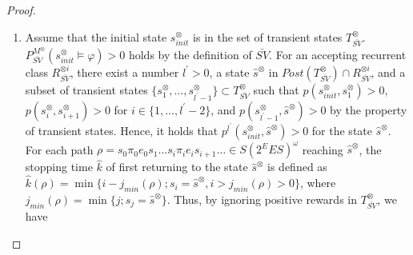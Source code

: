 \documentclass[10pt]{article}
\theoremstyle{definition}
\begin{document}
\begin{proof}
\begin{enumerate}
  \begin{align}
    V^{\bar{SV}}(s^{\otimes}_{init}) - V^{SV^{\ast}}(s^{\otimes}_{init})
     > & \frac{ \gamma^{\hat{K} - 1}}{ 1 - \gamma^{\hat{K} - 1}} r_p - ( m + \frac{1}{1-\gamma} ||\mathcal{R}_1||_{\infty} ) \nonumber \\
     = & ( \frac{ \gamma^{\hat{K} - 1}}{ 1 - \gamma^{\hat{K} - 1}} r_p - \frac{1}{1-\gamma} ||\mathcal{R}_1||_{\infty} ) - m, \nonumber
  \intertext{by the settings of $\gamma^{\ast}$ and $r^{\ast}_p$, we have}
    V^{\bar{SV}}(s^{\otimes}_{init}) - V^{SV^{\ast}}(s^{\otimes}_{init}) > & 0.
  \end{align}

  \item Assume that the initial state $s^{\otimes}_{init}$ is in the set of transient states $T_{\bar{SV}}^{\otimes}$.$P^{M^{\otimes}}_{\bar{SV}}(s^{\otimes}_{init} \models \varphi) > 0$ holds by the definition of $\bar{SV}$. For an accepting recurrent class $R^{\otimes i}_{\bar{SV}}$, there exist a number $l^{\prime} > 0$, a state $\hat{s}^{\otimes}$ in $Post(T^{\otimes}_{\bar{SV}}) \cap R^{\otimes i}_{\bar{SV}}$, and a subset of transient states $\{ s^{\otimes}_1, \ldots , s^{\otimes}_{l^{\prime}-1} \} \subset T^{\otimes}_{\bar{SV}}$ such that $p(s^{\otimes}_{init}, s^{\otimes}_1)>0$, $p(s^{\otimes}_{i}, s^{\otimes}_{i+1})>0$ for $i \in \{ 1,...,l^{\prime}-2 \}$, and $p(s^{\otimes}_{l^{\prime}-1}, \hat{s}^{\otimes})>0$ by the property of transient states.
    Hence, it holds that $p^{l^{\prime}}(s^{\otimes}_{init}, \hat{s}^{\otimes}) > 0$ for the state $\hat{s}^{\otimes}$. For each path $\rho = s_0 \pi_0 e_0 s_1 \ldots s_i \pi_i e_i s_{i+1} \ldots \in S (2^E E S)^{\omega}$ reaching $\hat{s}^{\otimes}$, the stopping time $\hat{k}$ of first returning to the state $\hat{s}^{\otimes}$ is defined as $\hat{k}(\rho) = \min \{ i - j_{min}(\rho) ; s_i = \hat{s}^{\otimes}, i>j_{min}(\rho)>0 \}$, where $j_{min}(\rho) = \min \{ j ; s_j = \hat{s}^{\otimes} \}$. Thus, by ignoring positive rewards in $T^{\otimes}_{\bar{SV}}$, we have


\end{enumerate}
\end{proof}
\end{document}

